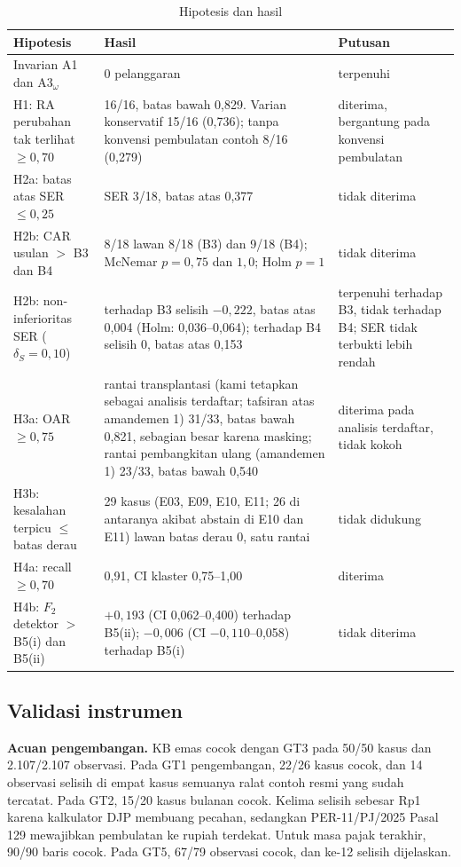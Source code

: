 \documentclass[journal,a4paper]{IEEEtran}
\makeatletter
\DeclareRobustCommand{\en}[1]{{\usefont{\f@encoding}{\f@family}{\f@series}{it}#1\/}}
\makeatother
\begin{document}
\begin{table}[t]
\centering
\caption{Hipotesis dan hasil}
\label{tab:putusan}
\scriptsize
\begin{tabularx}{\textwidth}{@{}P{3.6cm} L P{3.2cm}@{}}
\toprule
\textbf{Hipotesis} & \textbf{Hasil} & \textbf{Putusan} \\
\midrule
Invarian A1 dan A3$_\omega$ & 0 pelanggaran & terpenuhi \\
H1: RA perubahan tak terlihat $\geq 0{,}70$ & 16/16, batas bawah 0,829. Varian konservatif 15/16 (0,736); tanpa konvensi pembulatan contoh 8/16 (0,279) & diterima, bergantung pada konvensi pembulatan \\
H2a: batas atas SER $\leq 0{,}25$ & SER 3/18, batas atas 0,377 & tidak diterima \\
H2b: CAR usulan $>$ B3 dan B4 & 8/18 lawan 8/18 (B3) dan 9/18 (B4); McNemar $p = 0{,}75$ dan $1{,}0$; Holm $p = 1$ & tidak diterima \\
H2b: non-inferioritas SER ($\delta_S = 0{,}10$) & terhadap B3 selisih $-0{,}222$, batas atas 0,004 (Holm: 0,036--0,064); terhadap B4 selisih 0, batas atas 0,153 & terpenuhi terhadap B3, tidak terhadap B4; SER tidak terbukti lebih rendah \\
H3a: OAR $\geq 0{,}75$ & rantai transplantasi (kami tetapkan sebagai analisis terdaftar; tafsiran atas amandemen 1) 31/33, batas bawah 0,821, sebagian besar karena \en{masking}; rantai pembangkitan ulang (amandemen 1) 23/33, batas bawah 0,540 & diterima pada analisis terdaftar, tidak kokoh \\
H3b: kesalahan terpicu $\leq$ batas derau & 29 kasus (E03, E09, E10, E11; 26 di antaranya akibat \en{abstain} di E10 dan E11) lawan batas derau 0, satu rantai & tidak didukung \\
H4a: \en{recall} $\geq 0{,}70$ & 0,91, CI klaster 0,75--1,00 & diterima \\
H4b: $F_2$ detektor $>$ B5(i) dan B5(ii) & $+0{,}193$ (CI 0,062--0,400) terhadap B5(ii); $-0{,}006$ (CI $-0{,}110$--0,058) terhadap B5(i) & tidak diterima \\
\bottomrule
\end{tabularx}
\end{table}

\subsection{Validasi instrumen}
\textbf{Acuan pengembangan.} KB emas cocok dengan GT3 pada 50/50 kasus dan 2.107/2.107 observasi. Pada GT1 pengembangan, 22/26 kasus cocok, dan 14 observasi selisih di empat kasus semuanya ralat contoh resmi yang sudah tercatat. Pada GT2, 15/20 kasus bulanan cocok. Kelima selisih sebesar Rp1 karena kalkulator DJP membuang pecahan, sedangkan PER-11/PJ/2025 Pasal 129 mewajibkan pembulatan ke rupiah terdekat. Untuk masa pajak terakhir, 90/90 baris cocok. Pada GT5, 67/79 observasi cocok, dan ke-12 selisih dijelaskan.
\end{document}
